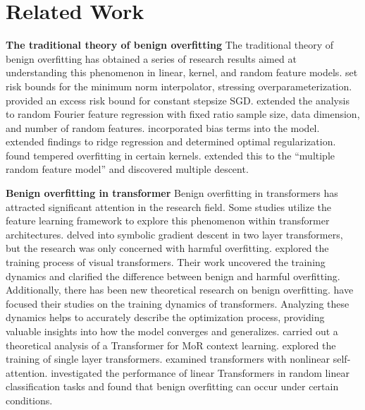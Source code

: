 \section{Related Work}
\textbf{The traditional theory of benign overfitting}   
The traditional theory of benign overfitting has obtained a series of research results aimed at understanding this phenomenon in linear, kernel, and random feature models. \cite{Bartlett_2020} set risk bounds for the minimum norm interpolator, stressing overparameterization. \cite{zou2021benignoverfittingconstantstepsizesgd} provided an excess risk bound for constant stepsize SGD. \cite{Liao_2021} extended the analysis to random Fourier feature regression with fixed ratio sample size, data dimension, and number of random features. \cite{adlam2021randommatrixperspectivemixtures} incorporated bias terms into the model. \cite{tsigler2022benignoverfittingridgeregression} extended findings to ridge regression and determined optimal regularization. \cite{mallinar2024benigntemperedcatastrophictaxonomy} found tempered overfitting in certain kernels. \cite{JMLR:v25:22-1389}  extended this to the “multiple random feature model” and discovered multiple descent. 

\textbf{Benign overfitting in transformer}   Benign overfitting in transformers has attracted significant attention in the research field. Some studies utilize the feature learning framework to explore this phenomenon within transformer architectures. \cite{li2024optimizationgeneralizationtwolayertransformers} delved into symbolic gradient descent in two layer transformers, but the research was only concerned with harmful overfitting. \cite{jiang2024unveilbenignoverfittingtransformer} explored the training process of visual transformers. Their work uncovered the training dynamics and clarified the difference between benign and harmful overfitting.  Additionally, there has been new theoretical research on benign overfitting.\cite{jelassi2022visiontransformersprovablylearn,tarzanagh2024transformerssupportvectormachines,tian2023scansnapunderstandingtraining} have focused their studies on the training dynamics of transformers. Analyzing these dynamics helps to accurately describe the optimization process, providing valuable insights into how the model converges and generalizes. \cite{jin2024provableincontextlearningmixture} carried out a theoretical analysis of a Transformer for MoR context learning.\cite{huang2023incontextconvergencetransformers}  explored the training of single layer transformers. \cite{li2024nonlineartransformerslearngeneralize}  examined transformers with nonlinear self-attention. \cite{frei2024trainedtransformerclassifiersgeneralize} investigated the performance of linear Transformers in random linear classification tasks and found that benign overfitting can occur under certain conditions.